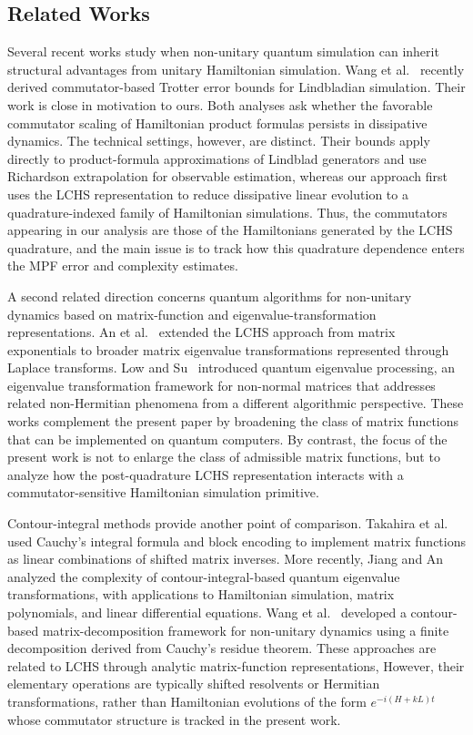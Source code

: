 \documentclass[10pt,reqno]{article}
\numberwithin{equation}{section}
\theoremstyle{plain}
\theoremstyle{definition}
\begin{document}
\subsection{Related Works}
Several recent works study when non-unitary quantum simulation can inherit structural advantages from unitary Hamiltonian simulation. Wang et al.~\cite{WangZhouWangZhengZhangLi2026Lindbladian} recently derived commutator-based Trotter error bounds for Lindbladian simulation. Their work is close in motivation to ours. Both analyses ask whether the favorable commutator scaling of Hamiltonian product formulas persists in dissipative dynamics. The technical settings, however, are distinct. Their bounds apply directly to product-formula approximations of Lindblad generators and use Richardson extrapolation for observable estimation, whereas our approach first uses the LCHS representation to reduce dissipative linear evolution to a quadrature-indexed family of Hamiltonian simulations. Thus, the commutators appearing in our analysis are those of the Hamiltonians generated by the LCHS quadrature, and the main issue is to track how this quadrature dependence enters the MPF error and complexity estimates.

A second related direction concerns quantum algorithms for non-unitary dynamics based on matrix-function and eigenvalue-transformation representations. An et al.~\cite{AnChildsLinYing2024LaplaceLCHS} extended the LCHS approach from matrix exponentials to broader matrix eigenvalue transformations represented through Laplace transforms. Low and Su~\cite{LowSu2024QEP} introduced quantum eigenvalue processing, an eigenvalue transformation framework for non-normal matrices that addresses related non-Hermitian phenomena from a different algorithmic perspective. These works complement the present paper by broadening the class of matrix functions that can be implemented on quantum computers. By contrast, the focus of the present work is not to enlarge the class of admissible matrix functions, but to analyze how the post-quadrature LCHS representation interacts with a commutator-sensitive Hamiltonian simulation primitive.

Contour-integral methods provide another point of comparison. Takahira et al.~\cite{TakahiraOhashiSogabeUsuda2021Contour} used Cauchy's integral formula and block encoding to implement matrix functions as linear combinations of shifted matrix inverses. More recently, Jiang and An~\cite{JiangAn2026ContourQET} analyzed the complexity of contour-integral-based quantum eigenvalue transformations, with applications to Hamiltonian simulation, matrix polynomials, and linear differential equations. Wang et al.~\cite{WangLiuXueZhuangDouChenGuo2025CBMD} developed a contour-based matrix-decomposition framework for non-unitary dynamics using a finite decomposition derived from Cauchy's residue theorem. These approaches are related to LCHS through analytic matrix-function representations, However, their elementary operations are typically shifted resolvents or Hermitian transformations, rather than Hamiltonian evolutions of the form \(e^{-i(H+kL)t}\) whose commutator structure is tracked in the present work.
\end{document}
